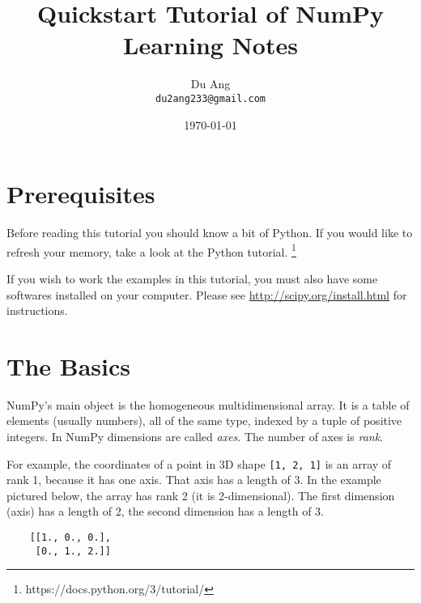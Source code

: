 \documentclass[UTF8]{article}
\title{Quickstart Tutorial of NumPy \\
        Learning Notes}
\author{Du Ang \\ \texttt{du2ang233@gmail.com} }
\date{\today}
\begin{document}
\maketitle

\tableofcontents
\newpage

\section{Prerequisites}
Before reading this tutorial you should know a bit of Python. If you would like to refresh your
memory, take a look at the Python tutorial.
\footnote{https://docs.python.org/3/tutorial/}

If you wish to work the examples in this tutorial, you must also have some softwares installed on
your computer. Please see \url{http://scipy.org/install.html} for instructions.

\section{The Basics}
NumPy's main object is the homogeneous multidimensional array. It is a table of elements (usually
numbers), all of the same type, indexed by a tuple of positive integers. In NumPy dimensions are
called \emph{axes}. The number of axes is \emph{rank}.

For example, the coordinates of a point in 3D shape \texttt{[1, 2, 1]} is an array of rank 1,
because it has one axis. That axis has a length of 3. In the example pictured below, the array has
rank 2 (it is 2-dimensional). The first dimension (axis) has a length of 2, the second dimension
has a length of 3.
\begin{verbatim}
    [[1., 0., 0.],
     [0., 1., 2.]]
\end{verbatim}
\end{document}
